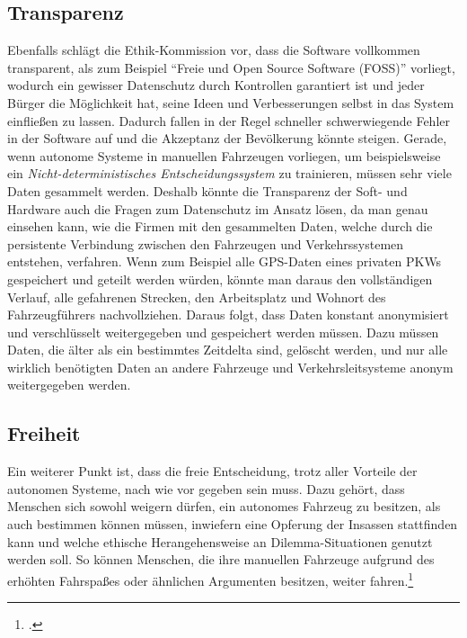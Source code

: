 \documentclass[a4paper, 12pt, openany]{book}
\begin{document}
            \subsection{Transparenz}
                Ebenfalls schlägt die Ethik-Kommission vor, dass die Software vollkommen transparent, als zum Beispiel \enquote{Freie und Open Source Software (FOSS)} vorliegt, wodurch ein gewisser Datenschutz durch Kontrollen garantiert ist und jeder Bürger die Möglichkeit hat, seine Ideen und Verbesserungen selbst in das System einfließen zu lassen. Dadurch fallen in der Regel schneller schwerwiegende Fehler in der Software auf und die Akzeptanz der Bevölkerung könnte steigen. Gerade, wenn autonome Systeme in manuellen Fahrzeugen vorliegen, um beispielsweise ein \textit{Nicht-deterministisches Entscheidungssystem} zu trainieren, müssen sehr viele Daten gesammelt werden. \label{datenschutz}Deshalb könnte die Transparenz der Soft- und Hardware auch die Fragen zum Datenschutz im Ansatz lösen, da man genau einsehen kann, wie die Firmen mit den gesammelten Daten, welche durch die persistente Verbindung zwischen den Fahrzeugen und Verkehrssystemen entstehen, verfahren. Wenn zum Beispiel alle GPS-Daten eines privaten PKWs gespeichert und geteilt werden würden, könnte man daraus den vollständigen Verlauf, alle gefahrenen Strecken, den Arbeitsplatz und Wohnort des Fahrzeugführers nachvollziehen. Daraus folgt, dass Daten konstant anonymisiert und verschlüsselt weitergegeben und gespeichert werden müssen. Dazu müssen Daten, die älter als ein bestimmtes Zeitdelta sind, gelöscht werden, und nur alle wirklich benötigten Daten an andere Fahrzeuge und Verkehrsleitsysteme anonym weitergegeben werden.
            
            \subsection{Freiheit}
                Ein weiterer Punkt ist, dass die freie Entscheidung, trotz aller Vorteile der autonomen Systeme, nach wie vor gegeben sein muss. Dazu gehört, dass Menschen sich sowohl weigern dürfen, ein autonomes Fahrzeug zu besitzen, als auch bestimmen können müssen, inwiefern eine Opferung der Insassen stattfinden kann und welche ethische Herangehensweise an Dilemma-Situationen genutzt werden soll. So können Menschen, die ihre manuellen Fahrzeuge aufgrund des erhöhten Fahrspaßes oder ähnlichen Argumenten besitzen, weiter fahren.\footcite{fig_akzeptanz}
            
\end{document}
